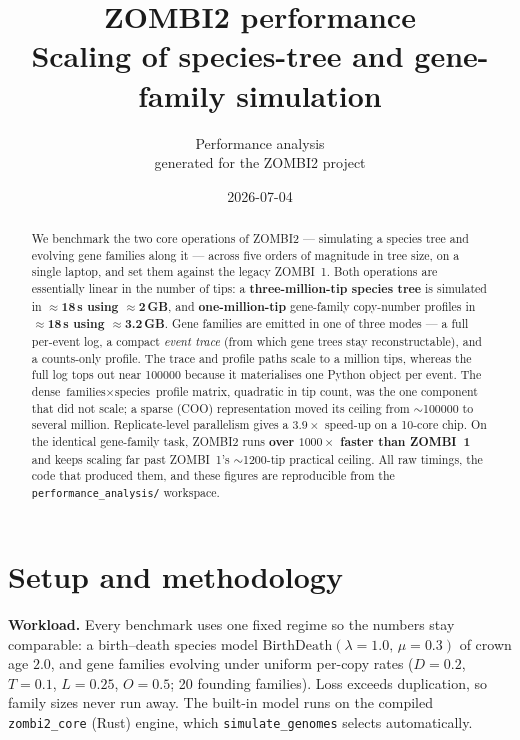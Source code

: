 \documentclass[11pt]{article}
\title{\vspace{-1.5em}\textbf{\Large ZOMBI2 performance}\\[0.3em]
  \large Scaling of species-tree and gene-family simulation}
\author{Performance analysis\\ \small\color{muted} generated for the ZOMBI2 project}
\date{\small 2026-07-04}
\newcommand{\headline}[1]{\textbf{#1}}
\begin{document}
\maketitle
\vspace{-1.5em}

\begin{abstract}
\noindent
We benchmark the two core operations of ZOMBI2 --- simulating a species tree and
evolving gene families along it --- across five orders of magnitude in tree size, on
a single laptop, and set them against the legacy ZOMBI~1. Both operations are
essentially linear in the number of tips: a \headline{three-million-tip species tree}
is simulated in \headline{$\approx$18\,s using $\approx$2\,GB}, and
\headline{one-million-tip} gene-family copy-number profiles in
\headline{$\approx$18\,s using $\approx$3.2\,GB}. Gene families are emitted in one of
three modes --- a full per-event log, a compact \emph{event trace} (from which gene
trees stay reconstructable), and a counts-only profile. The trace and profile paths
scale to a million tips, whereas the full log tops out near \num{100000} because it
materialises one Python object per event. The dense
$\text{families}\times\text{species}$ profile matrix, quadratic in tip count, was the
one component that did not scale; a sparse (COO) representation moved its ceiling from
$\sim$\num{100000} to several million. Replicate-level parallelism gives a
$3.9\times$ speed-up on a 10-core chip. On the identical gene-family task, ZOMBI2 runs
\headline{over $1000\times$ faster than ZOMBI~1} and keeps scaling far past ZOMBI~1's
$\sim$\num{1200}-tip practical ceiling. All raw timings, the code that produced them,
and these figures are reproducible from the \texttt{performance\_analysis/} workspace.
\end{abstract}

\section{Setup and methodology}

\textbf{Workload.} Every benchmark uses one fixed regime so the numbers stay
comparable: a birth--death species model $\text{BirthDeath}(\lambda{=}1.0,\,
\mu{=}0.3)$ of crown age $2.0$, and gene families evolving under uniform per-copy
rates ($D{=}0.2$, $T{=}0.1$, $L{=}0.25$, $O{=}0.5$; \num{20} founding families).
Loss exceeds duplication, so family sizes never run away. The built-in model runs
on the compiled \texttt{zombi2\_core} (Rust) engine, which \texttt{simulate\_genomes}
selects automatically.
\end{document}
